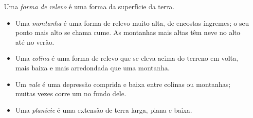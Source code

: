 \begin{definition}\label{def:g1:landscapes-around-us:landform}
Uma \emph{forma de relevo} é uma forma da superfície da terra.
\begin{itemize}
  \item Uma \emph{montanha} é uma forma de relevo muito alta,
        de encostas íngremes; o seu ponto mais alto se chama cume. As
        montanhas mais altas têm neve no alto até no verão.
  \item Uma \emph{colina} é uma forma de relevo que se eleva
        acima do terreno em volta, mais baixa e mais arredondada que uma
        montanha.
  \item Um \emph{vale} é uma depressão comprida e baixa entre
        colinas ou montanhas; muitas vezes corre um  no fundo dele.
  \item Uma \emph{planície} é uma extensão de terra larga, plana e baixa.
\end{itemize}
\end{definition}

